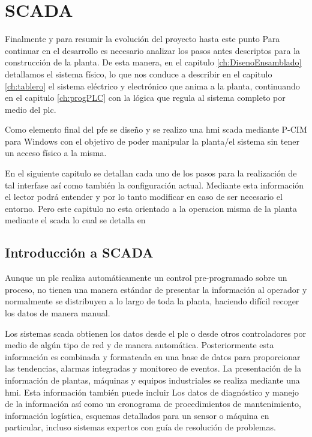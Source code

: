 \chapter{SCADA}
\label{ch:scada}

Finalmente y para resumir la evolución del proyecto hasta este punto
Para continuar en el desarrollo es necesario analizar los pasos antes descriptos para la construcción
de la planta. De esta manera, en el capitulo \ref{ch:DisenoEnsamblado} detallamos el sistema 
físico, lo que nos conduce a describir en el capitulo \ref{ch:tablero} el sistema eléctrico y
electrónico que anima a la planta, continuando en el capitulo \ref{ch:progPLC} con la lógica
que regula al sistema completo por medio del \gls{plc}. 

Como elemento final del \gls{pfe} se diseño y se realizo una \gls{hmi} \gls{scada}
mediante P-CIM para Windows con el objetivo de poder manipular la planta/el sistema
sin tener un acceso físico a la misma.

En el siguiente capitulo se detallan cada uno de los pasos para la realización de tal interfase
así como también la configuración actual. Mediante esta información el lector podrá entender
y por lo tanto modificar en caso de ser necesario el entorno. Pero este capitulo no esta 
orientado a la operacion misma de la planta mediante el \gls{scada} lo cual se detalla en 

\section{Introducción a SCADA}
\label{sec:IntroScada}

Aunque un \gls{plc} realiza automáticamente un control pre-programado sobre un proceso, 
no tienen una manera estándar de presentar la información al operador y normalmente se 
distribuyen a lo largo de toda la planta, haciendo difícil recoger los datos de manera 
manual.

Los sistemas \gls{scada} obtienen los datos desde el \gls{plc} o desde otros controladores 
por medio de algún tipo de red y de manera automática. Posteriormente esta información 
es combinada y formateada en una base de datos para proporcionar las tendencias, alarmas 
integradas y monitoreo de eventos. La presentación de la información de plantas, máquinas y 
equipos industriales se realiza mediante una \gls{hmi}. Esta información también puede 
incluir Los datos de diagnóstico y manejo de la información así como un cronograma de 
procedimientos de mantenimiento, información logística, esquemas detallados para un sensor 
o máquina en particular, incluso sistemas expertos con guía de resolución de problemas.


